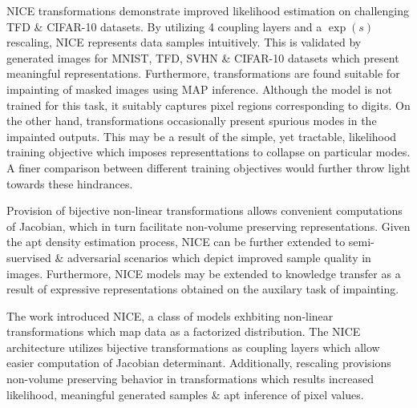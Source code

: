 \documentclass[11pt,letterpaper]{article}
\begin{document}
NICE transformations demonstrate improved likelihood estimation on challenging TFD \& CIFAR-10 datasets. By utilizing 4 coupling layers and a $\exp(s)$ rescaling, NICE represents data samples intuitively. This is validated by generated images for MNIST, TFD, SVHN \& CIFAR-10 datasets which present meaningful representations. Furthermore, transformations are found suitable for impainting of masked images using MAP inference. Although the model is not trained for this task, it suitably captures pixel regions corresponding to digits. On the other hand, transformations occasionally present spurious modes in the impainted outputs. This may be a result of the simple, yet tractable, likelihood training objective which imposes representtations to collapse on particular modes. A finer comparison between different training objectives would further throw light towards these hindrances. 

Provision of bijective non-linear transformations allows convenient computations of Jacobian, which in turn facilitate non-volume preserving representations. Given the apt density estimation process, NICE can be further extended to semi-suervised \& adversarial scenarios which depict improved sample quality in images. Furthermore, NICE models may be extended to knowledge transfer as a result of expressive representations obtained on the auxilary task of impainting. 

The work introduced NICE, a class of models exhbiting non-linear transformations which map data as a factorized distribution. The NICE architecture utilizes bijective transformations as coupling layers which allow easier computation of Jacobian determinant. Additionally, rescaling provisions non-volume preserving behavior in transformations which results increased likelihood, meaningful generated samples \& apt inference of pixel values. 
\end{document}
